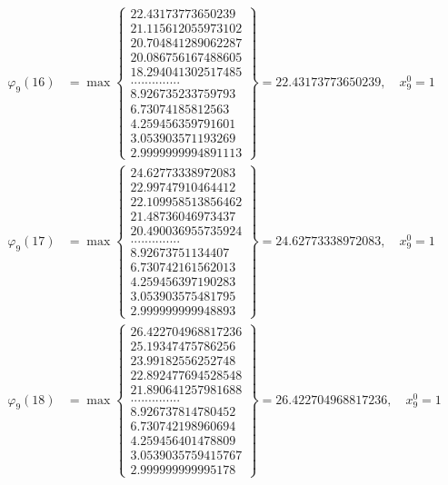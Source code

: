 \documentclass{article}
\begin{document}
\begin{align*}
  
  
  
\varphi_{9}(16) &= \max \left\{ \begin{array}{c}
22.43173773650239 \\
 21.115612055973102 \\
 20.704841289062287 \\
 20.086756167488605 \\
 18.294041302517485 \\
 .............. \\
 8.926735233759793 \\
 6.73074185812563 \\
 4.259456359791601 \\
 3.053903571193269 \\
 2.9999999994891113
\end{array} \right\} = 22.43173773650239, \quad x_{9}^0 = 1\\
  
  
  
  
\varphi_{9}(17) &= \max \left\{ \begin{array}{c}
24.62773338972083 \\
 22.99747910464412 \\
 22.109958513856462 \\
 21.48736046973437 \\
 20.490036955735924 \\
 .............. \\
 8.92673751134407 \\
 6.730742161562013 \\
 4.259456397190283 \\
 3.053903575481795 \\
 2.999999999948893
\end{array} \right\} = 24.62773338972083, \quad x_{9}^0 = 1\\
  
  
  
  
\varphi_{9}(18) &= \max \left\{ \begin{array}{c}
26.422704968817236 \\
 25.19347475786256 \\
 23.99182556252748 \\
 22.892477694528548 \\
 21.890641257981688 \\
 .............. \\
 8.926737814780452 \\
 6.730742198960694 \\
 4.259456401478809 \\
 3.0539035759415767 \\
 2.999999999995178
\end{array} \right\} = 26.422704968817236, \quad x_{9}^0 = 1\\
  

\end{align*}
\end{document}

